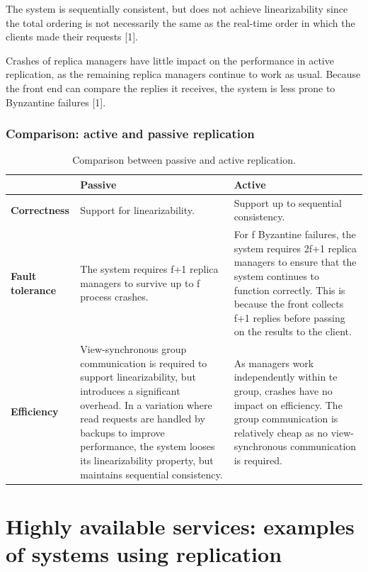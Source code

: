 The system is sequentially consistent, but does not achieve linearizability since the total ordering is not necessarily the same as the real-time order in which the clients made their requests [1].

Crashes of replica managers have little impact on the performance in active replication, as the remaining replica managers continue to work as usual. Because the front end can compare the replies it receives, the system is less prone to Bynzantine failures [1].


\subsubsection{Comparison: active and passive replication}


\begin{table}
	\caption{Comparison between passive and active replication.}
	\label{tab:compare:replication:faulttolerance}
	\begin{tabular}{p{80px} | p{155px} | p{155px}}
															& \textbf{Passive} & \textbf{Active} \\
		\hline
		\textbf{Correctness} 			& Support for linearizability. & Support up to sequential consistency. \\
		\textbf{Fault tolerance} 	& The system requires f+1 replica managers to survive up to f process crashes. & For f Byzantine failures, the system requires 2f+1 replica managers to ensure that the system continues to function correctly. This is because the front collects f+1 replies before passing on the results to the client. \\
		\textbf{Efficiency} 			& View-synchronous group communication is required to support linearizability, but introduces a significant overhead. In a variation where read requests are handled by backups to improve performance, the system looses its linearizability property, but maintains sequential consistency. & As managers work independently within te group, crashes have no impact on efficiency. The group communication is relatively cheap as no view-synchronous communication is required. \\
		\hline
	\end{tabular}
\end{table}




\section{Highly available services: examples of systems using replication}


